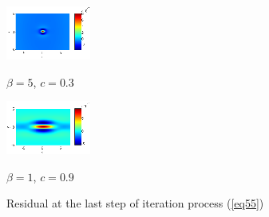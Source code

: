 \documentclass[preprint]{elsarticle}
\newcommand{\rf}[1]{(\ref{#1})}
\begin{document}
\begin{figure}[htbp]
	\begin{minipage}[b]{0.5\linewidth}
		 \centering
		\includegraphics[width=\linewidth]{residual/residual_bt5c03.eps}
		\centerline{$\beta = 5$, $c = 0.3$}
	\end{minipage}	
	\begin{minipage}[b]{0.5\linewidth}
		\centering
		 \includegraphics[width=\linewidth]{residual/residual_bt1c09.eps}
	\centerline{$\beta = 1$, $c = 0.9$ }
	\end{minipage}
		\caption{Residual at the last step of iteration process \rf{eq55} }
		\label{resid}
\end{figure}
\end{document}
